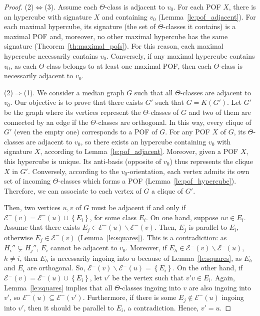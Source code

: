 \documentclass{article}
\newcommand{\set}[1]{\left\{ #1 \right\}}
\begin{document}
\begin{proof}
(2)$\Leftrightarrow$(3). Assume each $\Theta$-class is adjacent to $v_0$. For each POF $X$, there is an hypercube with signature $X$ and containing $v_0$ (Lemma~\ref{le:pof_adjacent}). For each maximal hypercube, its signature (the set of $\Theta$-classes it contains) is a maximal POF and, moreover, no other maximal hypercube has the same signature (Theorem~\ref{th:maximal_pofs}). For this reason, each maximal hypercube necessarily contains $v_0$. 
Conversely, if any maximal hypercube contains $v_0$, as each $\Theta$-class belongs to at least one maximal POF, then each $\Theta$-class is necessarily adjacent to $v_0$.

(2)$\Rightarrow$(1). We consider a median graph $G$ such that all $\Theta$-classes are adjacent to $v_0$. Our objective is to prove that there exists $G'$ such that $G = K(G')$. Let $G'$ be the graph where its vertices represent the $\Theta$-classes of $G$ and two of them are connected by an edge if the $\Theta$-classes are orthogonal. In this way, every clique of $G'$ (even the empty one) corresponds to a POF of $G$. For any POF $X$ of $G$, its $\Theta$-classes are adjacent to $v_0$, so there exists an hypercube containing $v_0$ with signature $X$, according to Lemma~\ref{le:pof_adjacent}. Moreover, given a POF $X$, this hypercube is unique. Its anti-basis (opposite of $v_0$) thus represents the clique $X$ in $G'$. Conversely, according to the $v_0$-orientation, each vertex admits its own set of incoming $\Theta$-classes which forms a POF (Lemma~\ref{le:pof_hypercube}). Therefore, we can associate to each vertex of $G$ a clique of $G'$. 

Then, two vertices $u,v$ of $G$ must be adjacent if and only if $\mathcal{E}^-(v) = \mathcal{E}^-(u) \cup \set{E_i}$, for some class $E_i$. On one hand, suppose $uv \in E_i$. Assume that there exists $E_j \in \mathcal{E}^-(u) \backslash \mathcal{E}^-(v)$. Then, $E_j$ is parallel to $E_i$, otherwise $E_j \in \mathcal{E}^-(v)$ (Lemma~\ref{le:squares}). This is a contradiction: as $H_i'' \subsetneq H_j''$, $E_i$ cannot be adjacent to $v_0$. Moreover, if $E_h \in \mathcal{E}^-(v) \backslash \mathcal{E}^-(u)$, $h \neq i$, then $E_h$ is necessarily ingoing into $u$ because of Lemma~\ref{le:squares}, as $E_h$ and $E_i$ are orthogonal. So, $\mathcal{E}^-(v) \backslash \mathcal{E}^-(u) = \set{E_i}$. On the other hand, if $\mathcal{E}^-(v) = \mathcal{E}^-(u) \cup \set{E_i}$, let $v'$ be the vertex such that $v'v \in E_i$. Again, Lemma~\ref{le:squares} implies that all $\Theta$-classes ingoing into $v$ are also ingoing into $v'$, so $\mathcal{E}^-(u) \subseteq \mathcal{E}^-(v')$. Furthermore, if there is some $E_j \notin \mathcal{E}^-(u)$ ingoing into $v'$, then it should be parallel to $E_i$, a contradiction. Hence, $v' = u$.


\end{proof}
\end{document}
